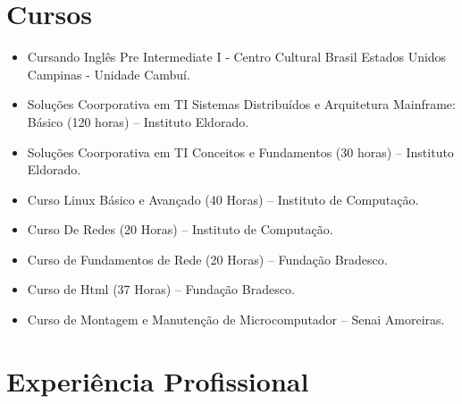 \documentclass[a4paper]{article}
\begin{document}
\section{Cursos}
\begin{itemize}

	\item Cursando Inglês Pre Intermediate I - Centro Cultural Brasil Estados Unidos Campinas - Unidade Cambuí.
	\item Soluções Coorporativa em TI Sistemas Distribuídos e Arquitetura Mainframe: Básico (120 horas) – Instituto Eldorado.
	\item Soluções Coorporativa em TI Conceitos e Fundamentos (30 horas) – Instituto Eldorado.
	\item Curso Linux Básico e Avançado (40 Horas) – Instituto de Computação.
	\item Curso De Redes (20 Horas) – Instituto de Computação.	
	\item Curso de Fundamentos de Rede (20 Horas) – Fundação Bradesco.
	\item Curso de Html (37 Horas) – Fundação Bradesco.
	\item Curso de Montagem e Manutenção de Microcomputador – Senai Amoreiras.

\end{itemize}


\section{Experiência Profissional}
\end{document}
